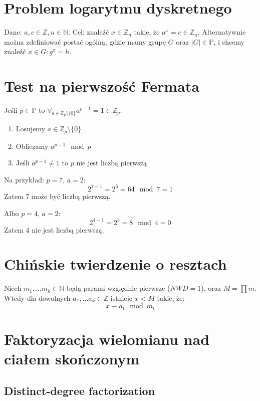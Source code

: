 \documentclass{../notatki}
\begin{document}
\section{Problem logarytmu dyskretnego}

Dane: $a, c \in \mathbb{Z}, n \in \mathbb{N}$. Cel: znaleźć $x \in
\mathbb{Z}_n$ takie, że $a^x = c \in \mathbb{Z}_n$. Alternatywnie można
zdefiniować postać ogólną, gdzie mamy grupę $G$ oraz $|G| \in \mathbb{P}$,
i chcemy znaleźć $x \in G : g^x = h$.

\section{Test na pierwszość Fermata}

Jeśli $p \in \mathbb{P}$ to $\forall_{a \in \mathbb{Z}_p \setminus
\{0\}} a^{p - 1} = 1 \in \mathbb{Z}_p$.

\begin{enumerate}
  \item Losujemy $a \in \mathbb{Z}_p \setminus \{0\}$
  \item Obliczamy $a^{p - 1} \mod p$
  \item Jeśli $a^{p - 1} \ne 1$ to $p$ nie jest liczbą pierwszą
\end{enumerate}

\noindent
Na przykład: $p = 7$, $a = 2$:
$$
2^{7 - 1} = 2^6 = 64 \mod 7 = 1
$$
Zatem $7$ może być liczbą pierwszą.

\noindent
Albo $p = 4$, $a = 2$:
$$
2^{4 - 1} = 2^3 = 8 \mod 4 = 0
$$
Zatem $4$ nie jest liczbą pierwszą.

\section{Chińskie twierdzenie o resztach}

Niech $m_1, \dots m_k \in \mathbb{N}$ będą parami względnie pierwsze
($NWD = 1$), oraz $M = \prod m$. Wtedy dla dowolnych $a_1, \dots a_k
\in \mathbb{Z}$ istnieje $x < M$ takie, że:
$$
x \equiv a_i \mod m_i
$$

\section{Faktoryzacja wielomianu nad ciałem skończonym}

\subsection{Distinct-degree factorization}
\end{document}
